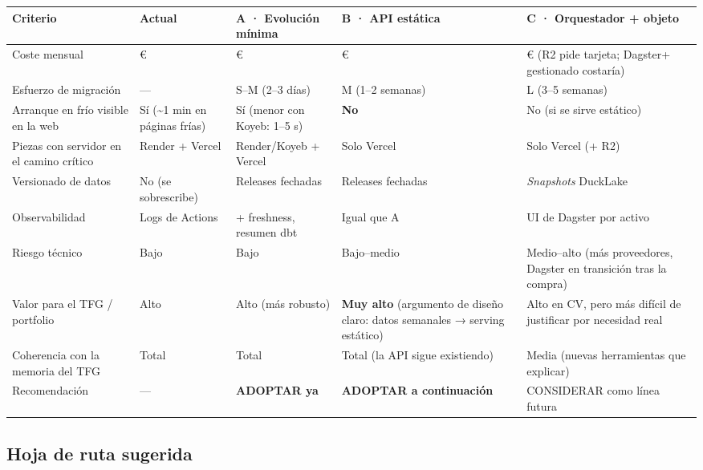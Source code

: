 {\footnotesize\sloppy\setlength{\tabcolsep}{5pt}\renewcommand{\arraystretch}{1.15}
\begin{longtable}{@{}>{\raggedright\arraybackslash}p{0.189\dimexpr(\linewidth-50pt)\relax}>{\raggedright\arraybackslash}p{0.140\dimexpr(\linewidth-50pt)\relax}>{\raggedright\arraybackslash}p{0.136\dimexpr(\linewidth-50pt)\relax}>{\raggedright\arraybackslash}p{0.267\dimexpr(\linewidth-50pt)\relax}>{\raggedright\arraybackslash}p{0.267\dimexpr(\linewidth-50pt)\relax}@{}}
\toprule
\textbf{Criterio} & \textbf{Actual} & \textbf{A · Evolución mínima} & \textbf{B · API estática} & \textbf{C · Orquestador + objeto} \\
\midrule\endhead
\bottomrule\endlastfoot
Coste mensual & 0 € & 0 € & 0 € & 0 € (R2 pide tarjeta; Dagster+ gestionado costaría) \\
Esfuerzo de migración & — & S–M (2–3 días) & M (1–2 semanas) & L (3–5 semanas) \\
Arranque en frío visible en la web & Sí (\textasciitilde{}1 min en páginas frías) & Sí (menor con Koyeb: 1–5 s) & \textbf{No} & No (si se sirve estático) \\
Piezas con servidor en el camino crítico & Render + Vercel & Render/Koyeb + Vercel & Solo Vercel & Solo Vercel (+ R2) \\
Versionado de datos & No (se sobrescribe) & Releases fechadas & Releases fechadas & \emph{Snapshots} DuckLake \\
Observabilidad & Logs de Actions & + freshness, resumen dbt & Igual que A & UI de Dagster por activo \\
Riesgo técnico & Bajo & Bajo & Bajo–medio & Medio–alto (más proveedores, Dagster en transición tras la compra) \\
Valor para el TFG / portfolio & Alto & Alto (más robusto) & \textbf{Muy alto} (argumento de diseño claro: datos semanales → serving estático) & Alto en CV, pero más difícil de justificar por necesidad real \\
Coherencia con la memoria del TFG & Total & Total & Total (la API sigue existiendo) & Media (nuevas herramientas que explicar) \\
Recomendación & — & \textbf{ADOPTAR ya} & \textbf{ADOPTAR a continuación} & CONSIDERAR como línea futura \\
\end{longtable}}

\subsection{Hoja de ruta sugerida}

